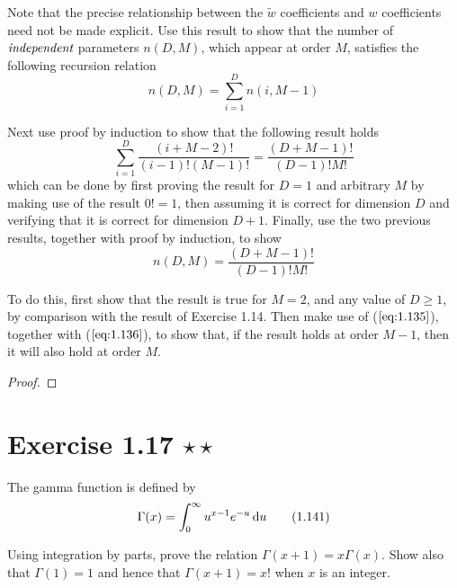 Note that the precise relationship between the $\widetilde{w}$ coefficients and
 $w$ coefficients need not be made explicit. Use this result to show that the number
 of $\emph{independent}$ parameters $n(D, M)$, which appear at order $M$, satisfies
 the following recursion relation
 \begin{equation*}
    n(D, M) = \sum_{i=1}^{D} n(i, M - 1) 
    \tag{1.135}\label{eq:1.135}
\end{equation*}

Next use proof by induction to show that the following result holds
\begin{equation*}
    \sum_{i=1}^{D} \frac{(i + M - 2)!}{(i - 1)!(M - 1)!} = \frac{(D + M - 1)!}{(D - 1)!M!}
    \tag{1.136}\label{eq:1.136}
\end{equation*}
which can be done by first proving the result for $D = 1$ and arbitrary $M$ by
making use of the result $0! = 1$, then assuming it is correct for dimension $D$ 
and verifying that it is correct for dimension $D + 1$. Finally, use the two previous
results, together with proof by induction, to show
\begin{equation*}
    n(D, M) = \frac{(D + M - 1)!}{(D - 1)!M!}
    \tag{1.137}\label{eq:1.137}
\end{equation*}

To do this, first show that the result is true for $M = 2$, and any value of $D \geq 1$,
by comparison with the result of Exercise 1.14. Then make use of ($\ref{eq:1.135}$), together
with ($\ref{eq:1.136}$), to show that, if the result holds at order $M - 1$, then it will
also hold at order $M$.

\vspace{1em}

\begin{proof}
    
\end{proof}

\section*{Exercise 1.17 $\star \star$}
The gamma function is defined by 
\begin{equation*}
    \Gamma(x) = \int_{0}^{\infty} u^{x - 1}e^{-u} \mathop{}\!\mathrm{d} u 
    \tag{1.141}\label{eq:1.141}
\end{equation*}

Using integration by parts, prove the relation $\Gamma(x + 1) = x\Gamma(x)$. Show
also that $\Gamma(1) = 1$ and hence that $\Gamma(x + 1) = x!$ when $x$ is
an integer.

